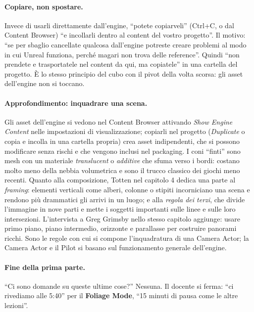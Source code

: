 \paragraph{Copiare, non spostare.} Invece di usarli direttamente dall'engine, ``potete
copiarveli'' (Ctrl+C, o dal Content Browser) ``e incollarli dentro al content del vostro
progetto''. Il motivo: ``se per sbaglio cancellate qualcosa dall'engine potreste creare
problemi al modo in cui Unreal funziona, perché magari non trova delle reference''. Quindi
``non prendete e trasportatele nel content da qui, ma copiatele'' in una cartella del
progetto. È lo stesso principio del cubo con il pivot della volta scorsa: gli asset
dell'engine non si toccano.

\paragraph{Approfondimento: inquadrare una scena.} Gli asset dell'engine si vedono nel
Content Browser attivando \emph{Show Engine Content} nelle impostazioni di visualizzazione;
copiarli nel progetto (\emph{Duplicate} o copia e incolla in una cartella propria) crea asset
indipendenti, che si possono modificare senza rischi e che vengono inclusi nel packaging. I
coni ``finti'' sono mesh con un materiale \emph{translucent} o \emph{additive} che sfuma verso
i bordi: costano molto meno della nebbia volumetrica e sono il trucco classico dei giochi
meno recenti. Quanto alla composizione, Totten nel capitolo 4 dedica una parte al
\emph{framing}: elementi verticali come alberi, colonne o stipiti incorniciano una scena e
rendono più drammatici gli arrivi in un luogo; e alla \emph{regola dei terzi}, che divide
l'immagine in nove parti e mette i soggetti importanti sulle linee e sulle loro
intersezioni. L'intervista a Greg Grimsby nello stesso capitolo aggiunge: usare primo piano,
piano intermedio, orizzonte e parallasse per costruire panorami ricchi. Sono le regole con
cui si compone l'inquadratura di una Camera Actor; la Camera Actor e il Pilot si basano sul
funzionamento generale dell'engine.

\paragraph{Fine della prima parte.} ``Ci sono domande su queste ultime cose?'' Nessuna. Il
docente si ferma: ``ci rivediamo alle 5:40'' per il \textbf{Foliage Mode}, ``15 minuti di pausa
come le altre lezioni''.


